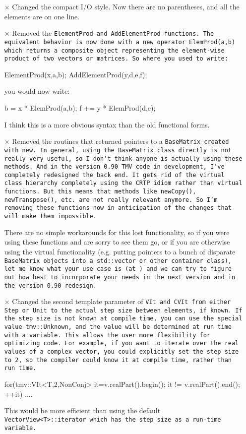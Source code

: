 \begin{itemize}
\item[$\times$]
Changed the compact I/O style. Now there are no parentheses, and all the elements are on one line.  

\item[$\times$] Removed the \tt{ElementProd} and \tt{AddElementProd} functions.  The equivalent behavior is now done with a new operator \tt{ElemProd(a,b)} which returns a composite object representing the element-wise product of two vectors or matrices.  So where you used to write:
\begin{tmvcode}
ElementProd(x,a,b);
AddElementProd(y,d,e,f);
\end{tmvcode}
you would now write:
\begin{tmvcode}
b = x * ElemProd(a,b);
f += y * ElemProd(d,e);
\end{tmvcode}
I think this is a more obvious syntax than the old functional forms.

\item[$\times$] 
Removed the routines that returned pointers to a \tt{BaseMatrix} created with \tt{new}.  In general, using the \tt{BaseMatrix} class directly is not really very useful, so I don't think anyone is actually using these methods.  And in the version 0.90 TMV code in development, I've completely redesigned the back end.  It gets rid of the virtual class hierarchy completely using the CRTP idiom rather than virtual functions.  But this means that methods like \tt{newCopy()}, \tt{newTranspose()}, etc. are not really relevant anymore.  So I'm removing these functions now in anticipation of the changes that will make them impossible.

There are no simple workarounds for this lost functionality, so if you were using these functions and are sorry to see them go, or if you are otherwise using the virtual functionality (e.g. putting pointers to a bunch of disparate \tt{BaseMatrix} objects into a \tt{std::vector} or other container class), let me know what your use case is (at \mygroup) and we can try to figure out how best to incorporate your needs in the next version and in the version 0.90 redesign.

\item[$\times$]
Changed the second template parameter of \tt{VIt} and \tt{CVIt} from either \tt{Step} or \tt{Unit} to the actual step size between elements, if known.  If the step size is not known at compile time, you can use the special value \tt{tmv::Unknown}, and the value will be determined at run time with a variable.  This allows the user more flexibility for optimizing code.  For example, if you want to iterate over the real values of a complex vector, you could explicitly set the step size to 2, so the compiler could know it at compile time, rather than run time.
\begin{tmvcode}
for(tmv::VIt<T,2,NonConj> it=v.realPart().begin(); 
    it != v.realPart().end(); ++it) {
  ....
}
\end{tmvcode}
This would be more efficient than using the default \tt{VectorView<T>::iterator} which has the step size as a run-time variable.


\end{itemize}
